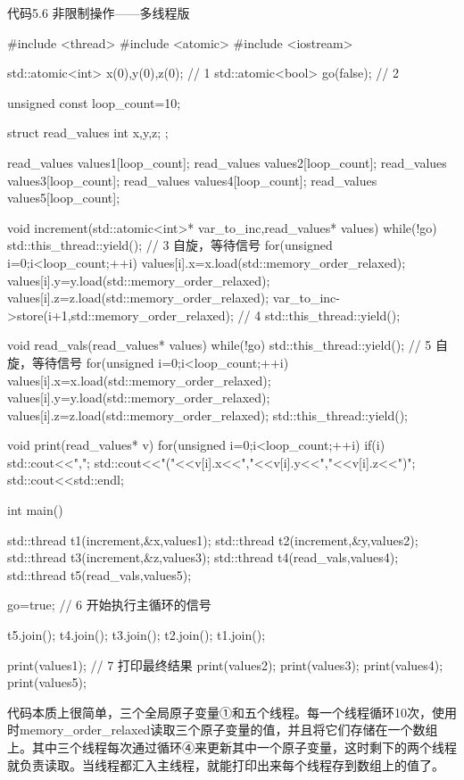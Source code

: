 代码5.6 非限制操作——多线程版

\begin{cpp}
#include <thread>
#include <atomic>
#include <iostream>

std::atomic<int> x(0),y(0),z(0);  // 1
std::atomic<bool> go(false);  // 2

unsigned const loop_count=10;

struct read_values
{
  int x,y,z;
};

read_values values1[loop_count];
read_values values2[loop_count];
read_values values3[loop_count];
read_values values4[loop_count];
read_values values5[loop_count];

void increment(std::atomic<int>* var_to_inc,read_values* values)
{
  while(!go)
    std::this_thread::yield();  // 3 自旋，等待信号
  for(unsigned i=0;i<loop_count;++i)
  {
    values[i].x=x.load(std::memory_order_relaxed);
    values[i].y=y.load(std::memory_order_relaxed);
    values[i].z=z.load(std::memory_order_relaxed);
    var_to_inc->store(i+1,std::memory_order_relaxed);  // 4
    std::this_thread::yield();
  }
}

void read_vals(read_values* values)
{
  while(!go)
    std::this_thread::yield(); // 5 自旋，等待信号
  for(unsigned i=0;i<loop_count;++i)
  {
    values[i].x=x.load(std::memory_order_relaxed);
    values[i].y=y.load(std::memory_order_relaxed);
    values[i].z=z.load(std::memory_order_relaxed);
    std::this_thread::yield();
  }
}

void print(read_values* v)
{
  for(unsigned i=0;i<loop_count;++i)
  {
    if(i)
      std::cout<<",";
    std::cout<<"("<<v[i].x<<","<<v[i].y<<","<<v[i].z<<")";
  }
  std::cout<<std::endl;
}

int main()
{
  std::thread t1(increment,&x,values1);
  std::thread t2(increment,&y,values2);
  std::thread t3(increment,&z,values3);
  std::thread t4(read_vals,values4);
  std::thread t5(read_vals,values5);

  go=true;  // 6 开始执行主循环的信号

  t5.join();
  t4.join();
  t3.join();
  t2.join();
  t1.join();

  print(values1);  // 7 打印最终结果
  print(values2);
  print(values3);
  print(values4);
  print(values5);
}
\end{cpp}

代码本质上很简单，三个全局原子变量①和五个线程。每一个线程循环10次，使用时memory\_order\_relaxed读取三个原子变量的值，并且将它们存储在一个数组上。其中三个线程每次通过循环④来更新其中一个原子变量，这时剩下的两个线程就负责读取。当线程都汇入主线程，就能打印出来每个线程存到数组上的值了。

